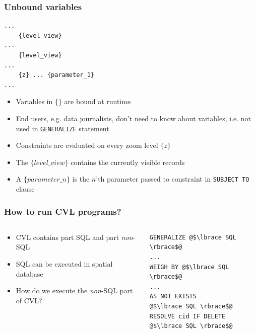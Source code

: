 \documentclass{beamer}
\begin{document}
\begin{frame}[fragile]
\frametitle{Unbound variables}
\begin{lstlisting}
...
    {level_view}
...    
    {level_view}
...
    {z} ... {parameter_1}
...
\end{lstlisting}
\begin{itemize}
\item Variables in $\lbrace \rbrace$ are bound at runtime
\item End users, e.g. data journalists, don't need to know about variables, i.e. not used in \texttt{GENERALIZE} statement
\item Constraints are evaluated on every zoom level $\lbrace z \rbrace$
\item The $\lbrace level\_view \rbrace$ contains the currently visible records
\item A $\lbrace parameter\_n \rbrace$ is the $n$'th parameter passed to constraint in \texttt{SUBJECT TO} clause

\end{itemize}
\end{frame}

\begin{frame}[fragile,t]
  \frametitle{How to run CVL programs?}
  \begin{columns}[t]
	\begin{column}[l]{5.5cm}
		\begin{itemize}[<+->]
			\item CVL contains part SQL and part \emph{non}-SQL
  			\item SQL can be executed in spatial database 
  			\item How do we execute the \emph{non}-SQL part of CVL?
  		\end{itemize}
	\end{column}
	\begin{column}[r]{5.5cm}
\begin{lstlisting}[escapechar=@]
GENERALIZE @$\lbrace SQL \rbrace$@ 
...
WEIGH BY @$\lbrace SQL \rbrace$@
...
AS NOT EXISTS
@$\lbrace SQL \rbrace$@
RESOLVE cid IF DELETE 
@$\lbrace SQL \rbrace$@
\end{lstlisting}
	\end{column}
  \end{columns}
\end{frame}
\end{document}

